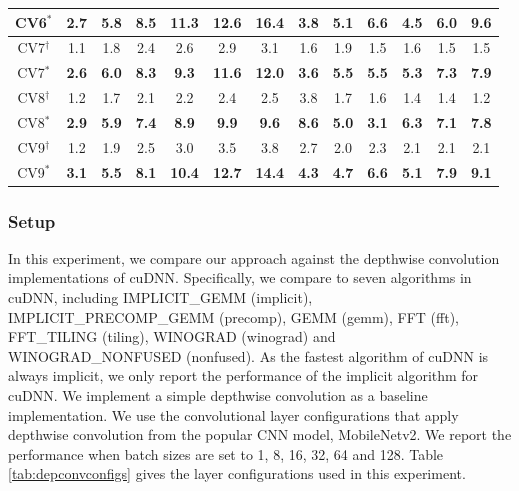 \begin{table}[]
\begin{threeparttable}
\begin{tabular}{c|cccccc|cccccc}
CV6$^{*}$&\textbf{2.7} &\textbf{5.8} &\textbf{8.5} &\textbf{11.3} &\textbf{12.6} &\textbf{16.4} &\textbf{3.8} &\textbf{5.1} &\textbf{6.6} &\textbf{4.5} &\textbf{6.0} &\textbf{9.6} \\
\hline
CV7$^{\dag}$&1.1 &1.8 &2.4 &2.6 &2.9 &3.1 &1.6 &1.9 &1.5 &1.6 &1.5 &1.5 \\
CV7$^{*}$&\textbf{2.6} &\textbf{6.0} &\textbf{8.3} &\textbf{9.3} &\textbf{11.6} &\textbf{12.0} &\textbf{3.6} &\textbf{5.5} &\textbf{5.5} &\textbf{5.3} &\textbf{7.3} &\textbf{7.9} \\
\hline
CV8$^{\dag}$&1.2 &1.7 &2.1 &2.2 &2.4 &2.5 &3.8 &1.7 &1.6 &1.4 &1.4 &1.2 \\
CV8$^{*}$&\textbf{2.9} &\textbf{5.9} &\textbf{7.4} &\textbf{8.9} &\textbf{9.9} &\textbf{9.6} &\textbf{8.6} &\textbf{5.0} &\textbf{3.1} &\textbf{6.3} &\textbf{7.1} &\textbf{7.8} \\
\hline
CV9$^{\dag}$&1.2 &1.9 &2.5 &3.0 &3.5 &3.8 &2.7 &2.0 &2.3 &2.1 &2.1 &2.1 \\
CV9$^{*}$&\textbf{3.1} &\textbf{5.5} &\textbf{8.1} &\textbf{10.4} &\textbf{12.7} &\textbf{14.4} &\textbf{4.3} &\textbf{4.7} &\textbf{6.6} &\textbf{5.1} &\textbf{7.9} &\textbf{9.1} \\

\bottomrule
\end{tabular}
\end{threeparttable}
\end{table}

%	
%


\subsubsection{Setup} In this experiment, we compare our approach against the depthwise convolution implementations of cuDNN. Specifically, we compare to seven algorithms in cuDNN, including IMPLICIT\_GEMM (implicit), IMPLICIT\_PRECOMP\_GEMM (precomp), GEMM (gemm), FFT (fft), FFT\_TILING (tiling), WINOGRAD (winograd) and WINOGRAD\_NONFUSED (nonfused). 
As the fastest algorithm of cuDNN is always implicit, we only report the performance of the implicit algorithm for cuDNN. 
We implement a simple depthwise convolution as a baseline implementation. 
We use the convolutional layer configurations that apply depthwise convolution from the popular CNN model, MobileNetv2. 
We report the performance when batch sizes are set to 1, 8, 16, 32, 64 and 128. 
Table \ref{tab:depconvconfigs} gives the layer configurations used in this experiment.

